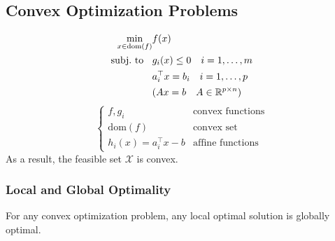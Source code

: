\subsection{Convex Optimization Problems}
\noindent\begin{align*}
    \min_{x\in\mathrm{dom}(f)} & f(x)                                     \\
    \text{subj.\ to\;\; }      & g_i(x)\leq0\quad i=1,\ldots,m            \\
                               & a_i^{\top} x=b_i \quad i=1,\ldots,p      \\
                               & (Ax =b\quad A\in \mathbb{R}^{p\times n})
\end{align*}
\begin{equation*}
    \begin{cases}
        f,g_i                    & \text{convex functions} \\
        \mathrm{dom}(f)          & \text{convex set}       \\
        h_i(x) = a_i^{\top} x -b & \text{affine functions}
    \end{cases}
\end{equation*}
As a result, the feasible set $\mathcal{X}$ is convex.

\subsubsection{Local and Global Optimality}
For any convex optimization problem, any local optimal solution is globally optimal.

